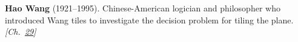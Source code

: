 \textbf{Hao Wang} (1921–1995). Chinese-American logician and philosopher who introduced Wang tiles to investigate the decision problem for tiling the plane. \emph{[Ch.~\hyperref[ch:hatmonotile]{29}]}

